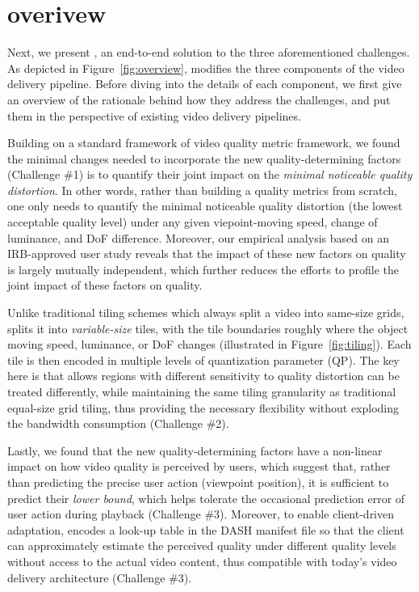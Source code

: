 
\section{\name overivew}

Next, we present {\em \name}, an end-to-end solution to the three aforementioned challenges.
As depicted in Figure~\ref{fig:overview}, \name modifies the three components of the video delivery pipeline. 
Before diving into the details of each component, we first give an overview of the rationale behind how they address the challenges, and put them in the perspective of existing video delivery pipelines. 



Building on a standard framework of video quality metric framework, we found the minimal changes needed to incorporate the new quality-determining factors (Challenge \#1) is to quantify their joint impact on the {\em minimal noticeable quality distortion}.
In other words, rather than building a \vrvideo quality metrics from scratch, one only needs to quantify the minimal noticeable quality distortion (\ie the lowest acceptable quality level) under any given viepoint-moving speed, change of luminance, and DoF difference. 
Moreover, our empirical analysis based on an IRB-approved user study reveals that the impact of these new factors on quality is largely mutually independent, which further reduces the efforts to profile the joint impact of these factors on \vrvideo quality.

Unlike traditional tiling schemes which always split a video into same-size grids, \name splits it into {\em variable-size} tiles, with the tile boundaries roughly where the object moving speed, luminance, or DoF changes (illustrated in Figure~\ref{fig:tiling}). 
Each tile is then encoded in multiple levels of quantization parameter (QP). %
The key here is that \name allows regions with different sensitivity to quality distortion can be treated differently, while maintaining the same tiling granularity as traditional equal-size grid tiling, thus providing the necessary flexibility without exploding the bandwidth consumption (Challenge \#2).


Lastly, we found that the new quality-determining factors have a non-linear impact on how video quality is perceived by users, which suggest that, rather than predicting the precise user action (\eg viewpoint position), it is sufficient to predict their {\em lower bound}, which helps tolerate the occasional prediction error of user action during playback (Challenge \#3).
Moreover, to enable client-driven adaptation, \name encodes a look-up table in the DASH manifest file so that the client can approximately estimate the perceived quality under different quality levels without access to the actual video content, thus compatible with today's video delivery architecture (Challenge \#3).



